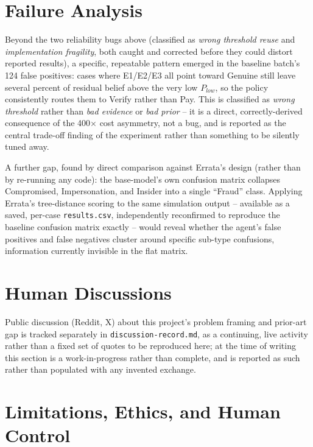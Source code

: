 \documentclass[10pt]{article}
\begin{document}
\section{Failure Analysis}

Beyond the two reliability bugs above (classified as \emph{wrong
threshold reuse} and \emph{implementation fragility}, both caught and
corrected before they could distort reported results), a specific,
repeatable pattern emerged in the baseline batch's 124 false
positives: cases where E1/E2/E3 all point toward Genuine still leave
several percent of residual belief above the very low $P_{low}$, so
the policy consistently routes them to Verify rather than Pay. This is
classified as \emph{wrong threshold} rather than \emph{bad evidence} or
\emph{bad prior} -- it is a direct, correctly-derived consequence of
the 400$\times$ cost asymmetry, not a bug, and is reported as the
central trade-off finding of the experiment rather than something to
be silently tuned away.

A further gap, found by direct comparison against Errata's design
(rather than by re-running any code): the base-model's own confusion
matrix collapses Compromised, Impersonation, and Insider into a single
``Fraud'' class. Applying Errata's tree-distance scoring to the same
simulation output -- available as a saved, per-case
\texttt{results.csv}, independently reconfirmed to reproduce the
baseline confusion matrix exactly -- would reveal whether the
agent's false positives and false negatives cluster around specific
sub-type confusions, information currently invisible in the flat
matrix.

\section{Human Discussions}

Public discussion (Reddit, X) about this project's problem framing and
prior-art gap is tracked separately in \texttt{discussion-record.md},
as a continuing, live activity rather than a fixed set of quotes to be
reproduced here; at the time of writing this section is a
work-in-progress rather than complete, and is reported as such rather
than populated with any invented exchange.

\section{Limitations, Ethics, and Human Control}
\end{document}
